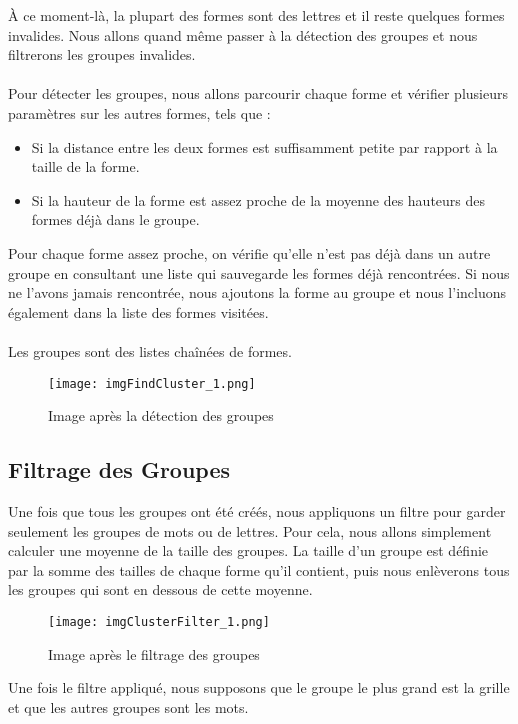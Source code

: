 \documentclass{article}
\begin{document}
À ce moment-là, la plupart des formes sont des lettres et il reste quelques formes invalides. Nous allons quand même passer à la détection des groupes et nous filtrerons les groupes invalides.
\\\\
Pour détecter les groupes, nous allons parcourir chaque forme et vérifier plusieurs paramètres sur les autres formes, tels que :
\begin{itemize}
    \item Si la distance entre les deux formes est suffisamment petite par rapport à la taille de la forme.
    \item Si la hauteur de la forme est assez proche de la moyenne des hauteurs des formes déjà dans le groupe.
\end{itemize}
\vspace{0.5cm}
Pour chaque forme assez proche, on vérifie qu'elle n'est pas déjà dans un autre groupe en consultant une liste qui sauvegarde les formes déjà rencontrées. Si nous ne l'avons jamais rencontrée, nous ajoutons la forme au groupe et nous l'incluons également dans la liste des formes visitées.
\\\\
Les groupes sont des listes chaînées de formes.

\begin{figure}[H]
    \centering
    \texttt{[image: imgFindCluster\_1.png]}
    \caption{Image après la détection des groupes}
\end{figure}

\subsection{Filtrage des Groupes}

Une fois que tous les groupes ont été créés, nous appliquons un filtre pour garder seulement les groupes de mots ou de lettres. Pour cela, nous allons simplement calculer une moyenne de la taille des groupes. La taille d'un groupe est définie par la somme des tailles de chaque forme qu'il contient, puis nous enlèverons tous les groupes qui sont en dessous de cette moyenne.

\begin{figure}[H]
    \centering
    \texttt{[image: imgClusterFilter\_1.png]}
    \caption{Image après le filtrage des groupes}
\end{figure}

Une fois le filtre appliqué, nous supposons que le groupe le plus grand est la grille et que les autres groupes sont les mots.
\end{document}
